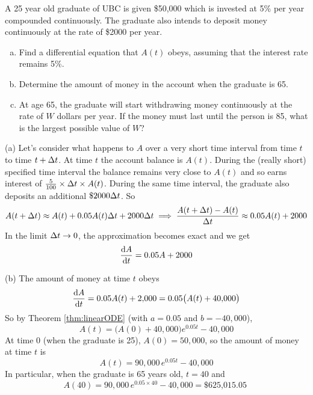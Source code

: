 \begin{eg}\label{eg:SDEmoneyC}
A 25 year old graduate of UBC is given \$50,000 which is invested
at 5\% per year compounded continuously. The graduate also intends to
deposit money continuously at the rate of \$2000 per year.
\begin{enumerate}[(a)]
\item  Find a differential equation that $A(t)$ obeys, assuming that
the interest rate remains 5\%.

\item  Determine the amount of money in the account when the graduate
is 65.

\item  At age 65, the graduate will start withdrawing money
continuously at the rate of $W$ dollars per year. If the money
must last until the person is 85, what is the largest possible
value of $W$?
\end{enumerate}

\soln (a) Let's consider what happens to $A$ over a very short time
interval from time $t$ to time $t + \Delta t$. At time $t$ the account balance
is $A(t)$. During the (really short) specified time interval the balance
remains very close to $A(t)$ and so earns interest of
$\frac{5}{100}\times\Delta t\times A(t)$.  During the same time interval,
the graduate also deposits an additional $\$ 2000\Delta t$. So
\begin{equation*}
A(t+\Delta t)\approx A(t) + 0.05 A(t)\Delta t+ 2000\Delta t
\implies
\frac{A(t+\Delta t)- A(t)}{\Delta t} \approx 0.05 A(t)  + 2000
\end{equation*}
In the limit $\Delta t\rightarrow 0$, the approximation becomes exact and
we get
\begin{equation*}
\diff{A}{t}= 0.05 A+2000
\end{equation*}

\noindent (b) The amount of money at time $t$ obeys
\begin{equation*}
\diff{A}{t}= 0.05 A(t)+2,\!000=0.05\big(A(t)+40,\!000\big)
\end{equation*}
So by Theorem \ref{thm:linearODE}
(with $a=0.05$ and $b=-40,\!000$),
\begin{equation*}
A(t)=\big(A(0)+40,\!000\big)e^{0.05 t} -40,\!000
\end{equation*}
At time 0 (when the graduate is 25), $A(0)=50,\!000$, so the amount of
money at time $t$ is
\begin{equation*}
A(t)=90,\!000\, e^{0.05 t}-40,000
\end{equation*}
In particular, when the graduate is 65 years old, $t=40$ and
\begin{equation*}
A(40)=90,\!000\, e^{0.05 \times 40}-40,000=\text{\$625,015.05 }
\end{equation*}


\end{eg}
